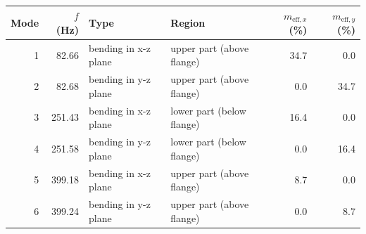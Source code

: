 \begin{tabular}{rrllrr}
\toprule
Mode & $f$ (Hz) & Type & Region & $m_{\mathrm{eff},x}$ (\%) & $m_{\mathrm{eff},y}$ (\%) \\
\midrule
1 & 82.66 & bending in x-z plane & upper part (above flange) & 34.7 & 0.0 \\
2 & 82.68 & bending in y-z plane & upper part (above flange) & 0.0 & 34.7 \\
3 & 251.43 & bending in x-z plane & lower part (below flange) & 16.4 & 0.0 \\
4 & 251.58 & bending in y-z plane & lower part (below flange) & 0.0 & 16.4 \\
5 & 399.18 & bending in x-z plane & upper part (above flange) & 8.7 & 0.0 \\
6 & 399.24 & bending in y-z plane & upper part (above flange) & 0.0 & 8.7 \\
\bottomrule
\end{tabular}
